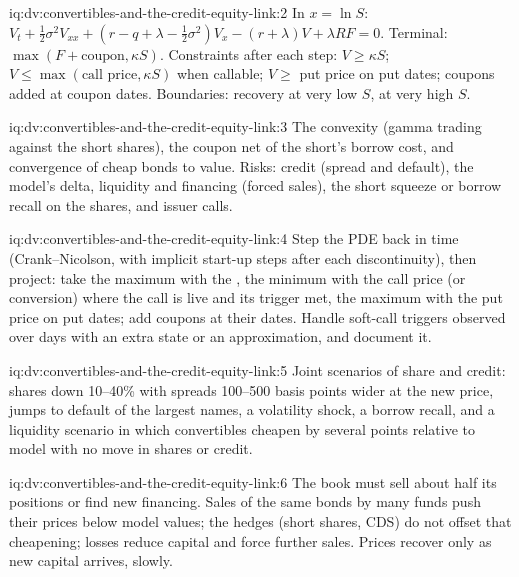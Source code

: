 \begin{solution}{iq:dv:convertibles-and-the-credit-equity-link:2}
In $x=\ln S$: $V_t+\frac12\sigma^2V_{xx}+(r-q+\lambda-\frac12\sigma^2)V_x-(r+\lambda)V+\lambda RF=0$. Terminal: $\max(F+\text{coupon},\kappa S)$.
Constraints after each step: $V\ge\kappa S$; $V\le\max(\text{call price},\kappa S)$ when callable; $V\ge$ put price on put dates; coupons added at
coupon dates. Boundaries: recovery at very low $S$,  at very high $S$.
\end{solution}

\begin{solution}{iq:dv:convertibles-and-the-credit-equity-link:3}
The convexity (gamma trading against the short shares), the coupon net of the short's borrow cost, and convergence of cheap bonds to value. Risks:
credit (spread and default), the model's delta, liquidity and financing (forced sales), the short squeeze or borrow recall on the shares, and
issuer calls.
\end{solution}

\begin{solution}{iq:dv:convertibles-and-the-credit-equity-link:4}
Step the PDE back in time (Crank--Nicolson, with implicit start-up steps after each discontinuity), then project: take the maximum with the
, the minimum with the call price (or conversion) where the call is live and its trigger met, the maximum with the put price on put
dates; add coupons at their dates. Handle soft-call triggers observed over days with an extra state or an approximation, and document it.
\end{solution}

\begin{solution}{iq:dv:convertibles-and-the-credit-equity-link:5}
Joint scenarios of share and credit: shares down 10--40\% with spreads 100--500 basis points wider at the new price, jumps to default of the largest
names, a volatility shock, a borrow recall, and a liquidity scenario in which convertibles cheapen by several points relative to model with no move in
shares or credit.
\end{solution}

\begin{solution}{iq:dv:convertibles-and-the-credit-equity-link:6}
The book must sell about half its positions or find new financing. Sales of the same bonds by many funds push their prices below model values; the
hedges (short shares, CDS) do not offset that cheapening; losses reduce capital and force further sales. Prices recover only as new capital arrives,
slowly.
\end{solution}
